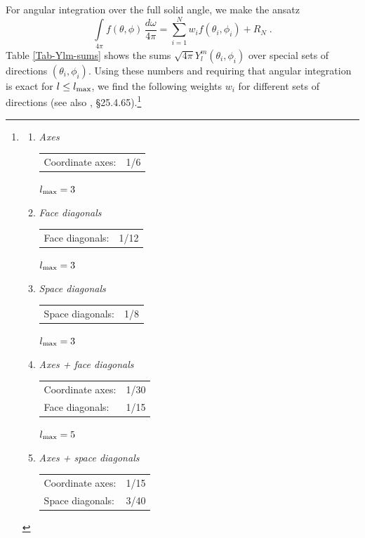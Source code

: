 \documentclass[\mydriver,12pt,twoside,notitlepage,a4paper]{article}
\begin{document}
For angular integration over the full solid angle, we make the ansatz
\begin{equation}
  \int\limits_{4\pi} f(\theta,\phi)\,\frac{d\omega}{4\pi}
  = \sum_{i=1}^{N} w_i f(\theta_i,\phi_i) + R_N \; .
\end{equation}
Table \ref{Tab-Ylm-sums} shows the sums
$\sqrt{4\pi}Y_l^m(\theta_i,\phi_i)$ over special sets of directions
$(\theta_i,\phi_i)$.
Using these numbers and requiring that angular integration is exact for
$l\le l_{\rm max}$, we find the following weights $w_i$ for different sets
of directions (see also \cite{Abramowitz-Stegun}, \S 25.4.65).\footnote{
\begin{enumerate}
\item \emph{Axes}

  \begin{tabular}{@{}lr}
    Coordinate axes: & 1/6
  \end{tabular}

  $l_{\rm max} = 3$

\item \emph{Face diagonals}

  \begin{tabular}{@{}lr}
    Face diagonals: & 1/12
  \end{tabular}

  $l_{\rm max} = 3$

\item \emph{Space diagonals}

  \begin{tabular}{@{}lr}
    Space diagonals: & 1/8
  \end{tabular}

  $l_{\rm max} = 3$

\item \emph{Axes + face diagonals}

  \begin{tabular}{@{}lr}
    Coordinate axes: & 1/30 \\
    Face diagonals:  & 1/15 \\
  \end{tabular}

  $l_{\rm max} = 5$

\item \emph{Axes + space diagonals}

  \begin{tabular}{@{}lr}
    Coordinate axes: & 1/15 \\
    Space diagonals: & 3/40 \\
  \end{tabular}


\end{enumerate}}
\end{document}
